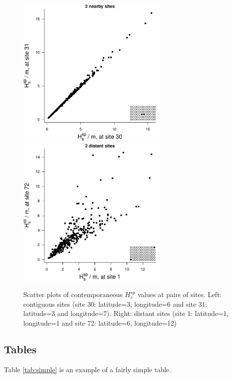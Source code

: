 \documentclass[a4paper,12pt,titlepage]{article} %
\numberwithin{equation}{section}  %
\begin{document}
\begin{figure}[h]    %
\centering           %
\includegraphics[width=7.5cm, angle=0]{space_dep_nearby.pdf}  %
\includegraphics[width=7.5cm, angle=0]{space_dep_distant.pdf} %
\vspace*{-0.25cm}    %
\caption{Scatter plots of contemporaneous $H^{sp}_s$ values at pairs of sites.  Left: contiguous sites (site 30: latitude=3, longitude=6 and site 31: latitude=3 and longitude=7). Right: distant sites (site 1: latitude=1, longitude=1 and site 72: latitude=6, longitude=12)}          %
\label{fig:space_dep}               %
\end{figure}                        %

\subsection{Tables}
\label{sec:tables}
Table \ref{tab:simple} is an example of a fairly simple table.
\end{document}
